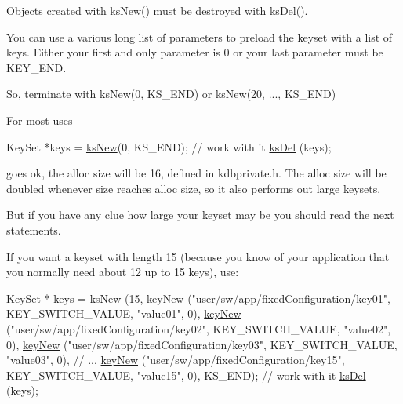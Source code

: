 Objects created with \hyperlink{group__keyset_ga671e1aaee3ae9dc13b4834a4ddbd2c3c}{ks\-New()} must be destroyed with \hyperlink{group__keyset_ga27e5c16473b02a422238c8d970db7ac8}{ks\-Del()}.

You can use a various long list of parameters to preload the keyset with a list of keys. Either your first and only parameter is 0 or your last parameter must be K\-E\-Y\-\_\-\-E\-N\-D.

So, terminate with ks\-New(0, K\-S\-\_\-\-E\-N\-D) or ks\-New(20, ..., K\-S\-\_\-\-E\-N\-D)

For most uses 
\begin{DoxyCode}
KeySet *keys = \hyperlink{group__keyset_ga671e1aaee3ae9dc13b4834a4ddbd2c3c}{ksNew}(0, KS\_END);
\textcolor{comment}{// work with it}
\hyperlink{group__keyset_ga27e5c16473b02a422238c8d970db7ac8}{ksDel} (keys);
\end{DoxyCode}
 goes ok, the alloc size will be 16, defined in kdbprivate.\-h. The alloc size will be doubled whenever size reaches alloc size, so it also performs out large keysets.

But if you have any clue how large your keyset may be you should read the next statements.

If you want a keyset with length 15 (because you know of your application that you normally need about 12 up to 15 keys), use\-: 
\begin{DoxyCode}
KeySet * keys = \hyperlink{group__keyset_ga671e1aaee3ae9dc13b4834a4ddbd2c3c}{ksNew} (15,
        \hyperlink{group__key_gad23c65b44bf48d773759e1f9a4d43b89}{keyNew} (\textcolor{stringliteral}{"user/sw/app/fixedConfiguration/key01"}, KEY\_SWITCH\_VALUE,
       \textcolor{stringliteral}{"value01"}, 0),
        \hyperlink{group__key_gad23c65b44bf48d773759e1f9a4d43b89}{keyNew} (\textcolor{stringliteral}{"user/sw/app/fixedConfiguration/key02"}, KEY\_SWITCH\_VALUE,
       \textcolor{stringliteral}{"value02"}, 0),
        \hyperlink{group__key_gad23c65b44bf48d773759e1f9a4d43b89}{keyNew} (\textcolor{stringliteral}{"user/sw/app/fixedConfiguration/key03"}, KEY\_SWITCH\_VALUE,
       \textcolor{stringliteral}{"value03"}, 0),
        \textcolor{comment}{// ...}
        \hyperlink{group__key_gad23c65b44bf48d773759e1f9a4d43b89}{keyNew} (\textcolor{stringliteral}{"user/sw/app/fixedConfiguration/key15"}, KEY\_SWITCH\_VALUE,
       \textcolor{stringliteral}{"value15"}, 0),
        KS\_END);
\textcolor{comment}{// work with it}
\hyperlink{group__keyset_ga27e5c16473b02a422238c8d970db7ac8}{ksDel} (keys);
\end{DoxyCode}



